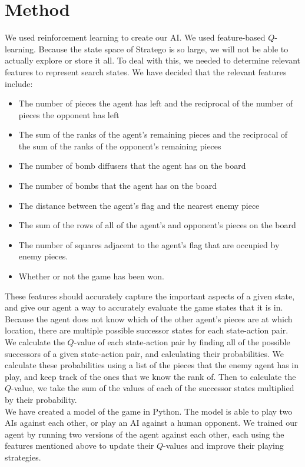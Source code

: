 \documentclass[letterpaper]{article}
\begin{document}
\section{Method}
We used reinforcement learning to create our AI. We used feature-based $Q$-learning. Because the state space of Stratego is so large, we will not be able to actually explore or store it all. To deal with this, we needed to determine relevant features to represent search states. We have decided that the relevant features include: 
\begin{itemize}
\item The number of pieces the agent has left and the reciprocal of the number of pieces the opponent has left
\item The sum of the ranks of the agent's remaining pieces and the reciprocal of the sum of the ranks of the opponent's remaining pieces
\item The number of bomb diffusers that the agent has on the board 
\item The number of bombs that the agent has on the board 
\item The distance between the agent's flag and the nearest enemy piece 
\item  The sum of the rows of all of the agent's and opponent's pieces on the board
\item The number of squares adjacent to the agent's flag that are occupied by enemy pieces.
\item Whether or not the game has been won.
\end{itemize}
These features should accurately capture the important aspects of a given state, and give our agent a way to accurately evaluate the game states that it is in.\\

Because the agent does not know which of the other agent's pieces are at which location, there are multiple possible successor states for each state-action pair. We calculate the $Q$-value of each state-action pair by finding all of the possible successors of a given state-action pair, and calculating their probabilities. We calculate these probabilities using a list of the pieces that the enemy agent has in play, and keep track of the ones that we know the rank of. Then to calculate the $Q$-value, we take the sum of the values of each of the successor states multiplied by their probability.\\

We have created a model of the game in Python. The model is able to play two AIs against each other, or play an AI against a human opponent. We trained our agent by running two versions of the agent against each other, each using the features mentioned above to update their $Q$-values and improve their playing strategies.\\
\end{document}
